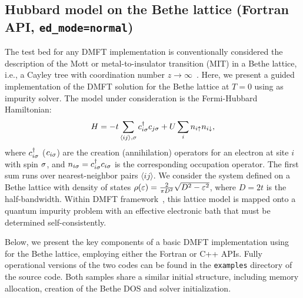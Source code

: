 \documentclass[edipack_sp.tex]{subfiles}
\begin{document}
\subsection{Hubbard model on the Bethe lattice (Fortran API, {\tt ed\_mode=normal})}\label{SecExamplesBetheDMFT}
The test bed for any DMFT implementation is conventionally considered 
the description of the Mott or metal-to-insulator transition (MIT) 
in a Bethe lattice, i.e., a Cayley tree with coordination number 
$z\to\infty$~\cite{Zhang1993PRLb,Caffarel1994PRL,Georges1996RMP,Rozenberg1999PRL,Kotliar1999EPJB,Kotliar2000PRL,Kotliar2002PRL}.
Here, we present a guided implementation of the DMFT 
solution for the Bethe lattice at $T=0$ using \NAME as impurity
solver.
The model under consideration is the Fermi-Hubbard Hamiltonian:
$$
H = -t \sum_{\langle ij\rangle,\sigma} c^\dagger_{i\sigma} c_{j\sigma} + 
    U \sum_i n_{i\uparrow}n_{i\downarrow},
$$
where $c^\dagger_{i\sigma}$ ($c_{i\sigma}$) are the creation (annihilation) 
operators for an electron at site $i$ with spin $\sigma$, and 
$n_{i\sigma} = c^\dagger_{i\sigma} c_{i\sigma}$ is the corresponding occupation 
operator. The first sum runs over nearest-neighbor pairs
$\langle ij \rangle$.
We consider the system defined on a Bethe lattice with density of states
$\rho(\varepsilon)=\frac{2}{\pi D^2}\sqrt{D^2-\varepsilon^2}$,
where $D=2t$ is the half-bandwidth.
Within DMFT framework~\cite{Georges1996RMP}, this lattice model is mapped onto a quantum impurity problem with an effective electronic bath that must be determined self-consistently.

Below, we present the key components of a basic DMFT implementation 
using \NAME for the Bethe lattice, employing either the Fortran or 
C++ APIs. Fully operational versions of the two codes can be found 
in the {\tt examples} directory of the \NAME source code. Both 
samples share a similar initial structure, including memory 
allocation, creation of the Bethe DOS and solver initialization.
\end{document}
